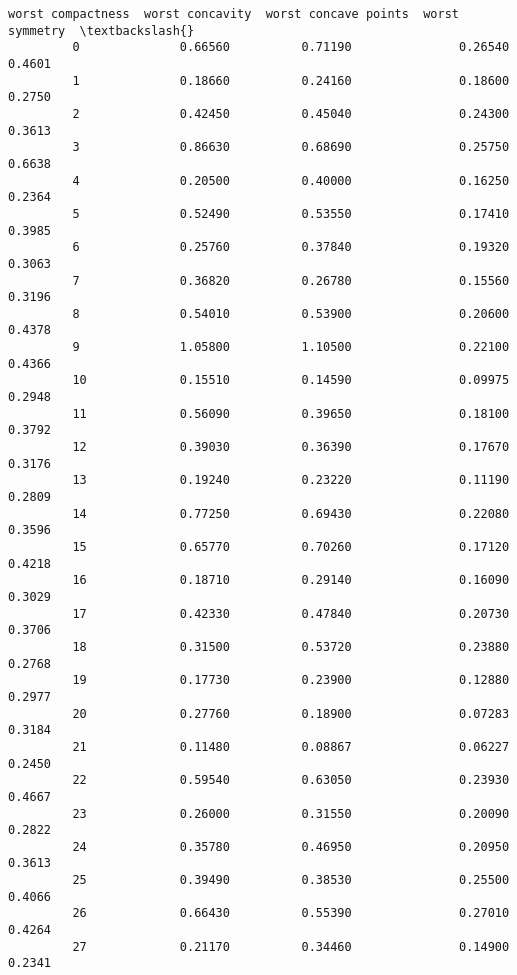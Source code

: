 \documentclass[11pt]{article}
\begin{document}
\begin{Verbatim}[commandchars=\\\{\}]
              worst compactness  worst concavity  worst concave points  worst symmetry  \textbackslash{}
         0              0.66560          0.71190               0.26540          0.4601   
         1              0.18660          0.24160               0.18600          0.2750   
         2              0.42450          0.45040               0.24300          0.3613   
         3              0.86630          0.68690               0.25750          0.6638   
         4              0.20500          0.40000               0.16250          0.2364   
         5              0.52490          0.53550               0.17410          0.3985   
         6              0.25760          0.37840               0.19320          0.3063   
         7              0.36820          0.26780               0.15560          0.3196   
         8              0.54010          0.53900               0.20600          0.4378   
         9              1.05800          1.10500               0.22100          0.4366   
         10             0.15510          0.14590               0.09975          0.2948   
         11             0.56090          0.39650               0.18100          0.3792   
         12             0.39030          0.36390               0.17670          0.3176   
         13             0.19240          0.23220               0.11190          0.2809   
         14             0.77250          0.69430               0.22080          0.3596   
         15             0.65770          0.70260               0.17120          0.4218   
         16             0.18710          0.29140               0.16090          0.3029   
         17             0.42330          0.47840               0.20730          0.3706   
         18             0.31500          0.53720               0.23880          0.2768   
         19             0.17730          0.23900               0.12880          0.2977   
         20             0.27760          0.18900               0.07283          0.3184   
         21             0.11480          0.08867               0.06227          0.2450   
         22             0.59540          0.63050               0.23930          0.4667   
         23             0.26000          0.31550               0.20090          0.2822   
         24             0.35780          0.46950               0.20950          0.3613   
         25             0.39490          0.38530               0.25500          0.4066   
         26             0.66430          0.55390               0.27010          0.4264   
         27             0.21170          0.34460               0.14900          0.2341   

\end{Verbatim}
\end{document}
